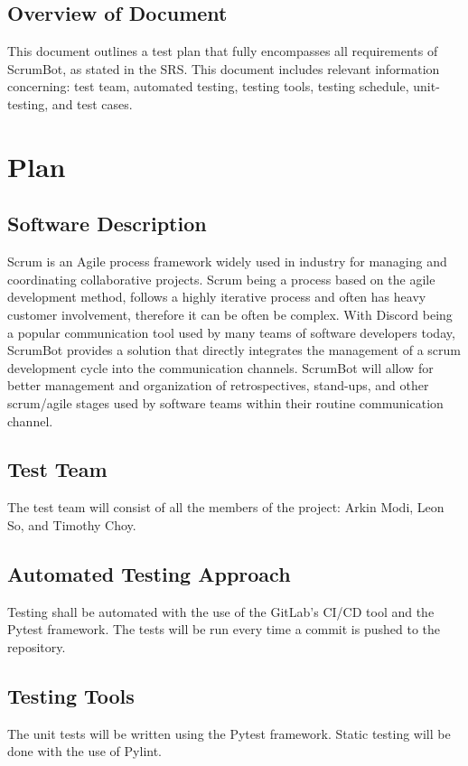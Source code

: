 \documentclass[12pt, titlepage]{article}
\begin{document}
\subsection{Overview of Document}
This document outlines a test plan that fully encompasses all requirements of ScrumBot, as stated in the SRS. This document includes relevant information concerning: test team, automated testing, testing tools, testing schedule, unit-testing, and test cases.

\section{Plan}
\subsection{Software Description}
Scrum is an Agile process framework widely used in industry for managing and coordinating collaborative projects. Scrum being a process based on the agile development method, follows a highly iterative process and often has heavy customer involvement, therefore it can be often be complex. With Discord being a popular communication tool used by many teams of software developers today, ScrumBot provides a solution that directly integrates the management of a scrum development cycle into the communication channels. ScrumBot will allow for better management and organization of retrospectives, stand-ups, and other scrum/agile stages used by software teams within their routine communication channel.

\subsection{Test Team}
The test team will consist of all the members of the project: Arkin Modi, Leon So, and Timothy Choy.

\subsection{Automated Testing Approach}
Testing shall be automated with the use of the GitLab's CI/CD tool and the Pytest framework. The tests will be run every time a commit is pushed to the repository.

\subsection{Testing Tools}
The unit tests will be written using the Pytest framework. Static testing will be done with the use of Pylint.
\end{document}
